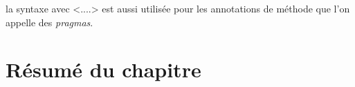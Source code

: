 \documentclass[a4paper,10pt,twoside]{book}
\begin{document}




 la syntaxe avec <....> est aussi utilis\'{e}e
pour les annotations de m\'{e}thode que l'on appelle des
\emph{pragmas}. %


\section{R\'{e}sum\'{e} du chapitre}
\end{document}
